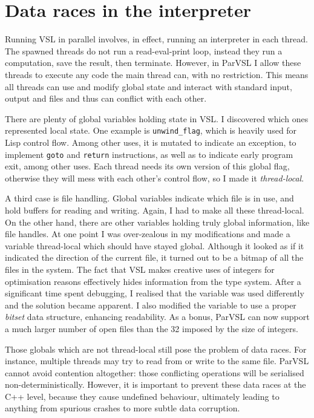 \section{Data races in the interpreter}
\label{sec:datarace}

Running VSL in parallel involves, in effect, running an interpreter in each thread. The spawned threads do not
run a read-eval-print loop, instead they run a computation, save the result, then terminate. However,
in ParVSL I allow these threads to execute any code the main thread can, with no restriction. This means
all threads can use and modify global state and interact with standard input, output and files and
thus can conflict with each other.

There are plenty of global variables holding state in VSL. I discovered which ones represented local
state.
One example is \verb|unwind_flag|, which is heavily used for Lisp control flow. Among other uses, it is
mutated to indicate an exception, to implement \verb|goto| and \verb|return| instructions,
as well as to indicate early program exit,
among other uses. Each thread needs its own version of this global flag, otherwise they will mess with each
other's control flow, so I made it \emph{thread-local}.

A third case is file handling. Global variables indicate which file is in use, and hold buffers for reading
and writing. Again, I had to make all these thread-local. On the other hand, there are other variables holding
truly global information, like file handles. At one point I was over-zealous in
my modifications and made a variable thread-local which should have stayed global. Although it looked as if it indicated
the direction of the current file, it turned out to be a bitmap of all the files in the system. The fact
that VSL makes creative uses of integers for optimisation reasons effectively hides information from the type system.
After a significant time spent debugging, I realised that the variable was used differently and the solution became apparent.
I also modified the variable to use a proper \emph{bitset} data structure, enhancing readability.
As a bonus, ParVSL can now support a much larger number of open files than the 32 imposed by the size of integers.

Those globals which are not thread-local still pose the problem of data races. For instance, multiple threads
may try to read from or write to the same file. ParVSL cannot avoid contention altogether: those conflicting
operations will be serialised non-deterministically. However, it is important to prevent these data races at
the C++ level, because they cause undefined behaviour, ultimately leading to anything from spurious crashes
to more subtle data corruption.


